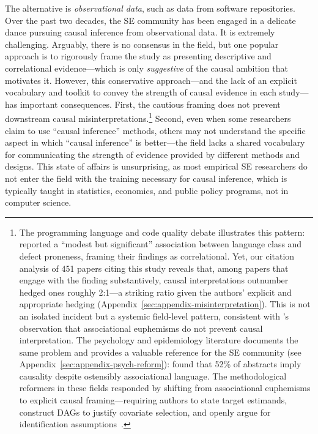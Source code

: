 The alternative is \emph{observational data}, such as data from software repositories.
Over the past two decades, the SE community has been engaged in a delicate dance pursuing causal inference from observational data.
It is extremely challenging.
Arguably, there is no consensus in the field, but one popular approach is to rigorously frame the study as presenting descriptive and correlational evidence---which is only \emph{suggestive} of the causal ambition that motivates it.
However, this conservative approach---and the lack of an explicit vocabulary and toolkit to convey the strength of causal evidence in each study---has important consequences.
First, the cautious framing does not prevent downstream causal misinterpretations.\footnote{The programming language and code quality debate illustrates this pattern: \citet{DBLP:conf/sigsoft/RayPFD14, DBLP:journals/cacm/RayPDF17} reported a ``modest but significant'' association between language class and defect proneness, framing their findings as correlational.
Yet, our citation analysis of 451 papers citing this study reveals that, among papers that engage with the finding substantively, causal interpretations outnumber hedged ones roughly 2:1---a striking ratio given the authors' explicit and appropriate hedging (Appendix~\ref{sec:appendix-misinterpretation}).
This is not an isolated incident but a systemic field-level pattern, consistent with \citeauthor{hernan2018cword}'s~\cite{hernan2018cword} observation that associational euphemisms do not prevent causal interpretation.
The psychology and epidemiology literature documents the same problem and provides a valuable reference for the SE community (see Appendix~\ref{sec:appendix-psych-reform}): \citet{haber2022causal} found that 52\% of abstracts imply causality despite ostensibly associational language.
The methodological reformers in these fields responded by shifting from associational euphemisms to explicit causal framing---requiring authors to state target estimands, construct DAGs to justify covariate selection, and openly argue for identification assumptions~\cite{grosz2020taboo, lundberg2021estimand, rohrer2018thinking, rohrer2024causal}.}
Second, even when some researchers claim to use ``causal inference'' methods, others may not understand the specific aspect in which ``causal inference'' is better---the field lacks a shared vocabulary for communicating the strength of evidence provided by different methods and designs.
This state of affairs is unsurprising, as most empirical SE researchers do not enter the field with the training necessary for causal inference, which is typically taught in statistics, economics, and public policy programs, not in computer science.

